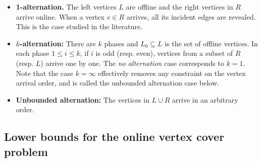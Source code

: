 \documentclass{article}
\begin{document}
\begin{itemize}
\item {\bf 1-alternation.} The left vertices $L$ are offline and the right vertices in $R$ arrive online. When a vertex $v\in R$ arrives, all its incident edges are revealed. This is the case studied in the literature.
\item {\bf $k$-alternation:}  There are $k$ phases and $L_0\subseteq L$ is the set of offline vertices. In each phase $1\leq i\leq k$, if $i$ is odd (resp. even), vertices from a subset of $R$ (resp. $L$) arrive one by one. 
The {\em no alternation} case corresponds to $k =1$.
Note that the case $k=\infty$ effectively removes any constraint on the vertex arrival order, and is called the unbounded alternation case below.
\item {\bf Unbounded alternation:} The vertices in $L\cup R$ arrive in an arbitrary order.
\end{itemize}

\subsection{Lower bounds for the online vertex cover problem}
\end{document}

